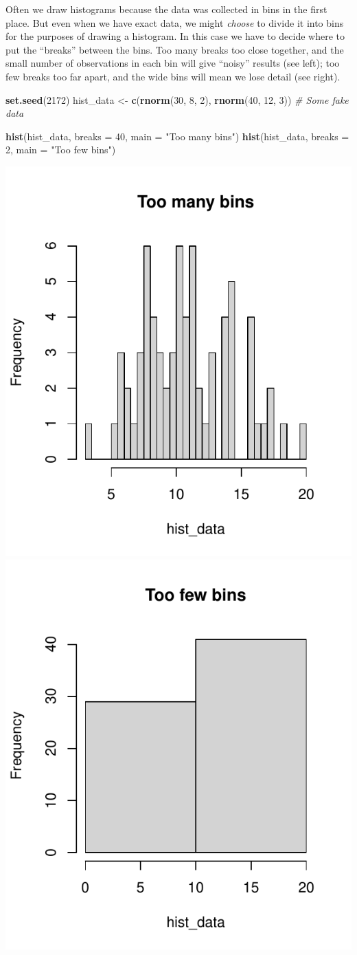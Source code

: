 \documentclass[
  a4paper,
]{book}
\newenvironment{Shaded}{\begin{snugshade}}{\end{snugshade}}
\newcommand{\AttributeTok}[1]{\textcolor[rgb]{0.13,0.29,0.53}{#1}}
\newcommand{\CommentTok}[1]{\textcolor[rgb]{0.56,0.35,0.01}{\textit{#1}}}
\newcommand{\DecValTok}[1]{\textcolor[rgb]{0.00,0.00,0.81}{#1}}
\newcommand{\FunctionTok}[1]{\textcolor[rgb]{0.13,0.29,0.53}{\textbf{#1}}}
\newcommand{\NormalTok}[1]{#1}
\newcommand{\OtherTok}[1]{\textcolor[rgb]{0.56,0.35,0.01}{#1}}
\newcommand{\StringTok}[1]{\textcolor[rgb]{0.31,0.60,0.02}{#1}}
\theoremstyle{definition}
\theoremstyle{definition}
\theoremstyle{definition}
\theoremstyle{definition}
\theoremstyle{remark}
\begin{document}
Often we draw histograms because the data was collected in bins in the first place. But even when we have exact data, we might \emph{choose} to divide it into bins for the purposes of drawing a histogram. In this case we have to decide where to put the ``breaks'' between the bins. Too many breaks too close together, and the small number of observations in each bin will give ``noisy'' results (see left); too few breaks too far apart, and the wide bins will mean we lose detail (see right).

\begin{Shaded}
\begin{Highlighting}[]
\FunctionTok{set.seed}\NormalTok{(}\DecValTok{2172}\NormalTok{)}
\NormalTok{hist\_data }\OtherTok{\textless{}{-}} \FunctionTok{c}\NormalTok{(}\FunctionTok{rnorm}\NormalTok{(}\DecValTok{30}\NormalTok{, }\DecValTok{8}\NormalTok{, }\DecValTok{2}\NormalTok{), }\FunctionTok{rnorm}\NormalTok{(}\DecValTok{40}\NormalTok{, }\DecValTok{12}\NormalTok{, }\DecValTok{3}\NormalTok{))  }\CommentTok{\# Some fake data}

\FunctionTok{hist}\NormalTok{(hist\_data, }\AttributeTok{breaks =} \DecValTok{40}\NormalTok{, }\AttributeTok{main =} \StringTok{"Too many bins"}\NormalTok{)}
\FunctionTok{hist}\NormalTok{(hist\_data, }\AttributeTok{breaks =} \DecValTok{2}\NormalTok{,  }\AttributeTok{main =} \StringTok{"Too few bins"}\NormalTok{)}
\end{Highlighting}
\end{Shaded}

\includegraphics[width=0.48\linewidth]{math1710_files/figure-latex/hist-bins-1} \includegraphics[width=0.48\linewidth]{math1710_files/figure-latex/hist-bins-2}
\end{document}
